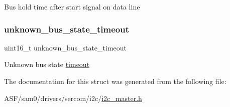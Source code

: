 Bus hold time after start signal on data line \mbox{\label{structi2c__master__config_ae1dc34ce71ac470c5f24c79bcd8d48e5}} 
\subsubsection{\texorpdfstring{unknown\_bus\_state\_timeout}{unknown\_bus\_state\_timeout}}
{\footnotesize\ttfamily uint16\+\_\+t unknown\+\_\+bus\+\_\+state\+\_\+timeout}

Unknown bus state \mbox{\hyperlink{i2c_common.h_asfdoc_sam0_sercom_i2c_unknown_bus_timeout}{timeout}} 

The documentation for this struct was generated from the following file\+:\begin{DoxyCompactItemize}
\item 
A\+S\+F/sam0/drivers/sercom/i2c/\mbox{\hyperlink{i2c__master_8h}{i2c\+\_\+master.\+h}}\end{DoxyCompactItemize}
